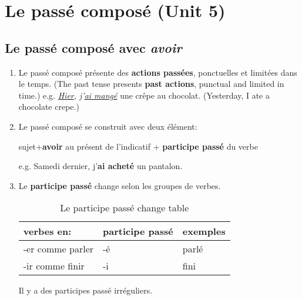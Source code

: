 \documentclass[math,code]{amznotes}
\theoremstyle{remark}
\begin{document}
\tableofcontents
\chapter{Le passé composé (Unit 5)}
\section{Le passé composé avec \textit{avoir}}
\begin{enumerate}
    \item Le passé composé présente des \textbf{actions passées}, ponctuelles et limitées dans le temps. (The past tense presents \textbf{past actions}, punctual and limited in time.) \newline
    e.g. \textit{\underline{Hier}, j'\underline{ai mangé}} une crêpe au chocolat. (Yesterday, I ate a chocolate crepe.)
    \item Le passé composé se construit avec deux élément: \newline
    \centerline{sujet+\textbf{avoir} au présent de l'indicatif + \textbf{participe passé} du verbe} \newline
    e.g. Samedi dernier, j'\textbf{ai acheté} un pantalon.
    \item Le \textbf{participe passé} change selon les groupes de verbes. \newline
    \begin{table}[h]
        \centering
        \begin{tabular}{|l|l|l|}
        \hline
        \textbf{verbes en:} & \textbf{participe passé} & \textbf{exemples} \\ \hline
        -er comme parler    & -é                       & parlé             \\ \hline
        -ir comme finir     & -i                       & fini              \\ \hline
        \end{tabular}
        \caption{Le participe passé change table}
        \label{tab:participe-passe-change-table}
    \end{table}
    \newline
    Il y a des participes passé irréguliers. \newline
    \begin{table}[h]

\end{table}
\end{enumerate}
\end{document}

